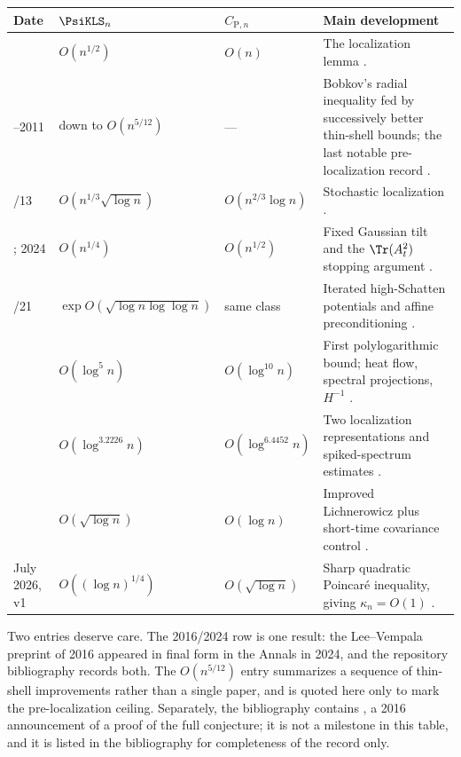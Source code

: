 \documentclass[../../main.tex]{subfiles}
\begin{document}
\begin{center}
\begin{tabularx}{\textwidth}{@{}>{\raggedright\arraybackslash}p{}>{\raggedright\arraybackslash}p{}>{\raggedright\arraybackslash}p{}Y@{}}
\toprule
Date & $\PsiKLS_n$ & $C_{\mathrm P,n}$ & Main development \\
 & $O(n^{1/2})$ & $O(n)$ & The localization lemma \cite{KannanLovaszSimonovits1995}. \\
--2011 & down to $O(n^{5/12})$ & --- & Bobkov's radial inequality fed by successively better
thin-shell bounds; the last notable pre-localization record \cite{GuedonMilman2011}. \\
/13 & $O(n^{1/3}\sqrt{\log n})$ & $O(n^{2/3}\log n)$ & Stochastic localization
\cite{Eldan2013ThinShell}. \\
; 2024 & $O(n^{1/4})$ & $O(n^{1/2})$ & Fixed Gaussian tilt and the $\Tr(A_t^2)$ stopping
argument \cite{LeeVempala2018,LeeVempala2024}. \\
/21 & $\exp O(\sqrt{\log n\log\log n})$ & same class & Iterated high-Schatten potentials and
affine preconditioning \cite{Chen2021}. \\
 & $O(\log^5 n)$ & $O(\log^{10}n)$ & First polylogarithmic bound; heat flow, spectral
projections, $H^{-1}$ \cite{KlartagLehec2022Polylog}. \\
 & $O(\log^{3.2226}n)$ & $O(\log^{6.4452}n)$ & Two localization representations and
spiked-spectrum estimates \cite{JambulapatiLeeVempala2022KLS}. \\
 & $O(\sqrt{\log n})$ & $O(\log n)$ & Improved Lichnerowicz plus short-time covariance
control \cite{Klartag2023Logarithmic}. \\
\addlinespace
July 2026, v1 & $O((\log n)^{1/4})$ & $O(\sqrt{\log n})$ & Sharp quadratic Poincar\'e inequality,
giving $\kappa_n=O(1)$ \cite{Letwin2026QuadraticKLS}. \\
\bottomrule
\end{tabularx}
\end{center}

\begin{remark}
\label{rem:history-table-caveats}
Two entries deserve care. The 2016/2024 row is one result: the Lee--Vempala preprint of 2016
appeared in final form in the Annals in 2024, and the repository bibliography records both. The
$O(n^{5/12})$ entry summarizes a sequence of thin-shell improvements rather than a single paper,
and is quoted here only to mark the pre-localization ceiling. Separately, the bibliography
contains \cite{vempala2016kls}, a 2016 announcement of a proof of the full conjecture; it is not
a milestone in this table, and it is listed in the bibliography for completeness of the record
only.
\end{remark}
\end{document}
